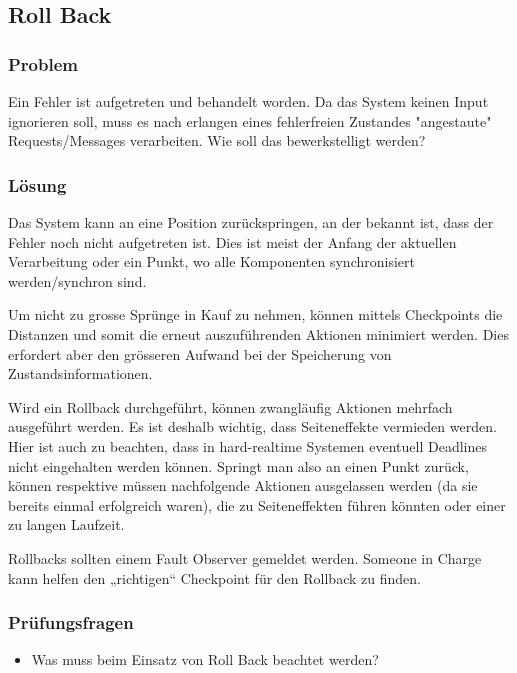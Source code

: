 \subsection{Roll Back}


\subsubsection*{Problem}


Ein Fehler ist aufgetreten und behandelt worden. Da das System keinen Input ignorieren soll, muss es nach erlangen eines fehlerfreien Zustandes "angestaute" Requests/Messages verarbeiten. Wie soll das bewerkstelligt werden?

\subsubsection*{Lösung}


Das System kann an eine Position zurückspringen, an der bekannt ist, dass der Fehler noch nicht aufgetreten ist. Dies ist meist der Anfang der aktuellen Verarbeitung oder ein Punkt, wo alle Komponenten synchronisiert werden/synchron sind.

Um nicht zu grosse Sprünge in Kauf zu nehmen, können mittels Checkpoints die Distanzen und somit die erneut auszuführenden Aktionen minimiert werden. Dies erfordert aber den grösseren Aufwand bei der Speicherung von Zustandsinformationen.

Wird ein Rollback durchgeführt, können zwangläufig Aktionen mehrfach ausgeführt werden. Es ist deshalb wichtig, dass Seiteneffekte vermieden werden. Hier ist auch zu beachten, dass in hard-realtime Systemen eventuell Deadlines nicht eingehalten werden können. Springt man also an einen Punkt zurück, können respektive müssen nachfolgende Aktionen ausgelassen werden (da sie bereits einmal erfolgreich waren), die zu Seiteneffekten führen könnten oder einer zu langen Laufzeit.

Rollbacks sollten einem Fault Observer gemeldet werden. Someone in Charge kann helfen den „richtigen“ Checkpoint für den Rollback zu finden.

\subsubsection*{Prüfungsfragen}

\begin{itemize}
	\item Was muss beim Einsatz von Roll Back beachtet werden?
\end{itemize}

